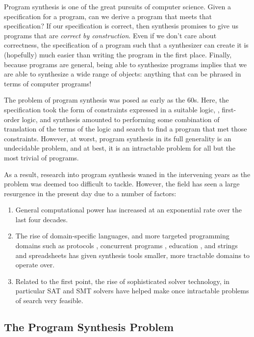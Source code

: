 Program synthesis is one of the great pursuits of computer science.  Given a
specification for a program, can we derive a program that meets that
specification?  If our specification is correct, then synthesis promises to give
us programs that are \emph{correct by construction}.  Even if we don't care
about correctness, the specification of a program such that a synthesizer can
create it is (hopefully) much easier than writing the program in the first
place.  Finally, because programs are general, being able to synthesize programs
implies that we are able to synthesize a wide range of objects: anything that
can be phrased in terms of computer programs!

The problem of program synthesis was posed as early as the 60s.
Here, the specification took the form of constraints expressed in a suitable
logic, \eg, first-order logic, and synthesis amounted to performing some
combination of translation of the terms of the logic and search to find a
program that met those constraints.  However, at worst, program synthesis in its
full generality is an undecidable problem, and at best, it is an intractable
problem for all but the most trivial of programs.

As a result, research into program synthesis waned in the intervening years as the
problem was deemed too difficult to tackle.  However, the field has seen a
large resurgence in the present day due to a number of factors:

\begin{enumerate}
\item General computational power has increased at an exponential rate over the
last four decades.
\item The rise of domain-specific languages, and more targeted programming
domains such as protocols \cite{alur-popl-2005, udupa-pldi-2013}, concurrent
programs \cite{solar-lezama-pldi-2008, cerny-cav-2011, prountzos-oopsla-2012},
education \cite{singh-pldi-2013}, and strings and spreadsheets
\cite{gulwani-popl-2011} has given synthesis tools smaller, more tractable
domains to operate over.
\item Related to the first point, the rise of sophisticated solver technology,
in particular SAT and SMT solvers have helped make once intractable problems of
search very feasible.
\end{enumerate}

\subsection{The Program Synthesis Problem}

